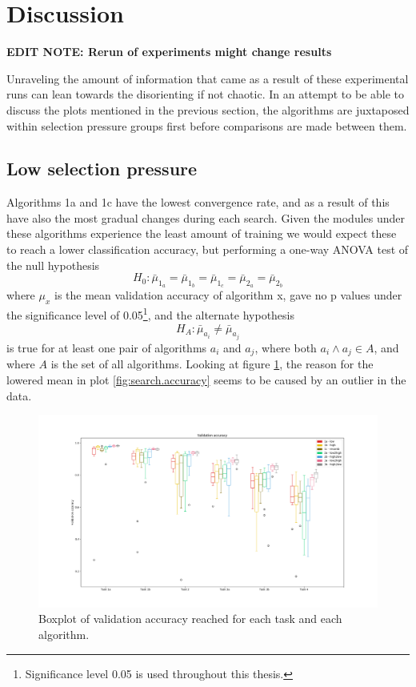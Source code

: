 \section{Discussion}
\textbf{EDIT NOTE: Rerun of experiments might change results}

Unraveling the amount of information that came as a result of these experimental runs can lean towards the disorienting if not chaotic. In an attempt to be able to discuss the plots mentioned in the previous section, the algorithms are juxtaposed within selection pressure groups first before comparisons are made between them. 

\subsection{Low selection pressure}
Algorithms 1a and 1c have the lowest convergence rate, and as a result of this have also the most gradual changes during each search. Given the modules under these algorithms experience the least amount of training we would expect these to reach a lower classification accuracy, but performing a one-way ANOVA test of the null hypothesis
\begin{equation*}
    \label{eq:H0.accuracy.notLowPressure}
    H_{0}:\bar{\mu}_{1_{a}}=\bar{\mu}_{1_{b}}=\bar{\mu}_{1_{c}}=\bar{\mu}_{2_{a}}=\bar{\mu}_{2_{b}}
\end{equation*}
where \(\mu_{x}\) is the mean validation accuracy of algorithm x, gave no p values under the significance level of 0.05\footnote{Significance level 0.05 is used throughout this thesis.}, and the alternate hypothesis
\begin{equation*}
    \label{eq:H0.accuracy.notLowPressure}
    H_{A}:\bar{\mu}_{a_{i}} \neq \bar{\mu}_{a_{j}} 
\end{equation*}
is true for at least one pair of algorithms \(a_{i}\) and \(a_{j}\), where both \(a_{i} \land a_{j} \in A\), and where \(A\) is the set of all algorithms. Looking at figure \ref{fig:search.validation}, the reason for the lowered mean in plot \ref{fig:search.accuracy} seems to be caused by an outlier in the data.

\begin{figure}[p!]%
    \includegraphics[width=\textwidth]{Chapters/Experiments/search_algo/figures/validation_boxplot.png}
    \caption{Boxplot of validation accuracy reached for each task and each algorithm.}
    \label{fig:search.validation}
\end{figure}

